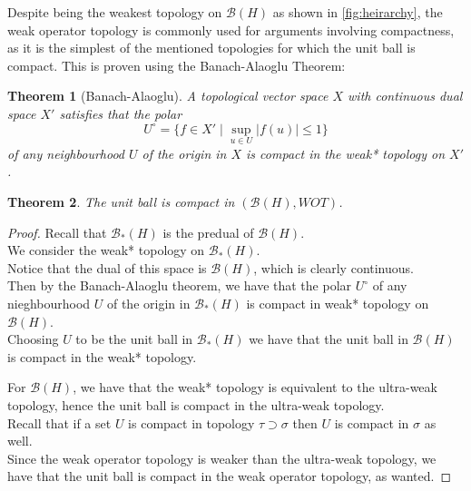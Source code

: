 \documentclass{article}
\theoremstyle{plain}
\newtheorem{theorem}{Theorem}
\theoremstyle{definition}
\newcommand{\abs}[1]{\left\lvert #1 \right\rvert}
\newcommand{\BH}{\cal{B}(H)}
\newcommand{\PDBH}{\cal{B}_*(H)}
\renewcommand{\cal}[1]{\mathcal{#1}}
\begin{document}
        Despite being the weakest topology on $\BH$ as shown in \cref{fig:heirarchy}, the weak operator topology is commonly used for arguments involving compactness, as it is the simplest of the mentioned topologies for which the unit ball is compact.
        This is proven using the Banach-Alaoglu Theorem:
        \begin{theorem}[Banach-Alaoglu] \label{thm:BA}
                A topological vector space $X$ with continuous dual space $X'$ satisfies that the polar
                        $$U^\circ = \{f \in X' \mid \sup_{u \in U} \abs{f(u)} \leq 1\}$$
                of any neighbourhood $U$ of the origin in $X$ is compact in the weak* topology on $X'$.
        \end{theorem}
        \begin{theorem}
                The unit ball is compact in $(\BH, WOT)$.
        \end{theorem}
        \begin{proof}
                Recall that $\PDBH$ is the predual of $\BH$.\\
                We consider the weak* topology on $\PDBH$.\\
                Notice that the dual of this space is $\BH$, which is clearly continuous.\\
                Then by the Banach-Alaoglu theorem, we have that the polar $U^\circ$ of any nieghbourhood $U$ of the origin in $\PDBH$ is compact in weak* topology on $\BH$.\\
                Choosing $U$ to be the unit ball in $\PDBH$ we have that the unit ball in $\BH$ is compact in the weak* topology.

                For $\BH$, we have that the weak* topology is equivalent to the ultra-weak topology, hence the unit ball is compact in the ultra-weak topology.\\ %
                Recall that if a set $U$ is compact in topology $\tau \supset \sigma$ then $U$ is compact in $\sigma$ as well.\\
                Since the weak operator topology is weaker than the ultra-weak topology, we have that the unit ball is compact in the weak operator topology, as wanted.
        \end{proof}
\end{document}
